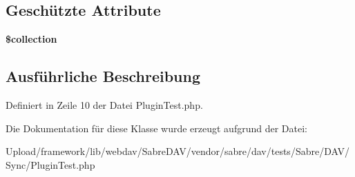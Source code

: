 \subsection*{Geschützte Attribute}
\begin{DoxyCompactItemize}
\item 
\mbox{\label{class_sabre_1_1_d_a_v_1_1_sync_1_1_plugin_test_ab1803d5dc8ec4015ebbda6155f2ccb59}} 
{\bfseries \$collection}
\end{DoxyCompactItemize}


\subsection{Ausführliche Beschreibung}


Definiert in Zeile 10 der Datei Plugin\+Test.\+php.



Die Dokumentation für diese Klasse wurde erzeugt aufgrund der Datei\+:\begin{DoxyCompactItemize}
\item 
Upload/framework/lib/webdav/\+Sabre\+D\+A\+V/vendor/sabre/dav/tests/\+Sabre/\+D\+A\+V/\+Sync/Plugin\+Test.\+php\end{DoxyCompactItemize}
